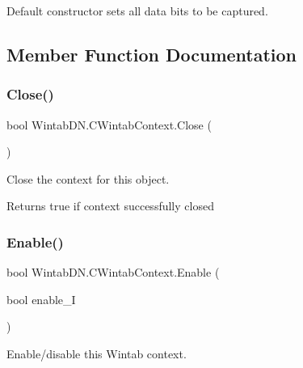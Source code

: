 Default constructor sets all data bits to be captured. 



\subsection{Member Function Documentation}
\mbox{\label{class_wintab_d_n_1_1_c_wintab_context_a53d935082727bc049f9d817363e6200f}} 
\subsubsection{\texorpdfstring{Close()}{Close()}}
{\footnotesize\ttfamily bool Wintab\+D\+N.\+C\+Wintab\+Context.\+Close (\begin{DoxyParamCaption}{ }\end{DoxyParamCaption})\hspace{0.3cm}{\ttfamily [inline]}}



Close the context for this object. 

\begin{DoxyReturn}{Returns}
true if context successfully closed
\end{DoxyReturn}
\mbox{\label{class_wintab_d_n_1_1_c_wintab_context_a580c1e6691c4c58c8d54d429e7d7ebd8}} 
\subsubsection{\texorpdfstring{Enable()}{Enable()}}
{\footnotesize\ttfamily bool Wintab\+D\+N.\+C\+Wintab\+Context.\+Enable (\begin{DoxyParamCaption}\item[{bool}]{enable\+\_\+I }\end{DoxyParamCaption})\hspace{0.3cm}{\ttfamily [inline]}}



Enable/disable this Wintab context. 


